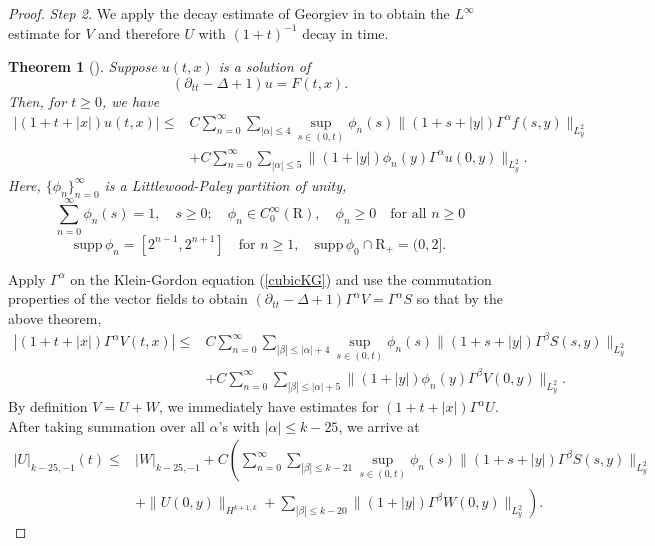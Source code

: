 \documentclass[12pt]{amsart}
\newtheorem{theorem}{Theorem}[section]
\numberwithin{equation}{section} \numberwithin{theorem}{section}
\numberwithin{example}{section} \numberwithin{remark}{section}
\numberwithin{figure}{section} \numberwithin{algorithm}{section}
\def\be{\begin{equation}}
\def\ee{\end{equation}}
\def\ptt{\partial_{tt}}
\def\mR{\mbox{R}}
\def\Ga{\Gamma^{\alpha}}
\def\Gb{\Gamma^{\beta}}
\def\LGN{|}
\def\RGN#1{|_{#1}}
\def\Hw{H}
\begin{document}
\begin{proof}
\emph{Step 2.} We apply the decay estimate of Georgiev in
\cite{Georgiev} to obtain the $L^\infty$ estimate for $V$ and
therefore $U$ with $(1+t)^{-1}$ decay in time.
\begin{theorem}[{\cite[Theorem 1]{Georgiev}}]\label{thm:Georgiev}Suppose $u(t,x)$
is a solution of\[(\ptt -\Delta +1)u=F(t,x).\]Then, for $t\ge0$, we
have
\[
\begin{split}|(1+t+|x|)u(t,x)|\le& C\sum_{n=0}^\infty\sum_{|\alpha|\le4}
\sup_{s\in(0,t)}\phi_n(s)\|(1+s+|y|)\Ga f(s,y)\|_{L^2_y}\\
&+C\sum_{n=0}^\infty\sum_{|\alpha|\le5}\|(1+|y|)\phi_n(y)\Ga
u(0,y)\|_{L^2_y}.
\end{split}
\]
Here, $\{\phi_n\}_{n=0}^\infty$ is a Littlewood-Paley partition of
unity,
\[\sum_{n=0}^\infty\phi_n(s)=1,\quad s\ge0;\quad\phi_n\in C^\infty_0(\mR),
\quad\phi_n\ge0\quad\mbox{for all }n\ge0\]
\[\mbox{supp}\,\phi_n=[2^{n-1},2^{n+1}]\quad\mbox{for }n\ge1,
\quad\mbox{supp}\,\phi_0\cap\mR_+=(0,2].\]
\end{theorem}

Apply $\Ga$ on the Klein-Gordon equation (\ref{cubicKG}) and use the
commutation properties of the vector fields to obtain \((\ptt
-\Delta +1)\Ga V=\Ga S\) so that by the above theorem,
\[
\begin{split}|(1+t+|x|)\Ga V(t,x)|\le& C\sum_{n=0}^\infty
\sum_{|\beta|\le|\alpha|+4}
\sup_{s\in(0,t)}\phi_n(s)\|(1+s+|y|)\Gb S(s,y)\|_{L^2_y}\\
&+C\sum_{n=0}^\infty\sum_{|\beta|\le|\alpha|+5}
\|(1+|y|)\phi_n(y)\Gb V(0,y)\|_{L^2_y}.
\end{split}
\]
By definition $V=U+W$, we immediately have estimates for
$(1+t+|x|)\Ga U$. After taking summation over all $\alpha$'s with
$|\alpha|\le k-25$, we arrive at \be\label{estimate:infty}
\begin{split}\LGN U\RGN{k-25,-1}(t)\le& \LGN W\RGN{k-25,-1}+
C\left(\sum_{n=0}^\infty\sum_{|\beta|\le k-21}
\sup_{s\in(0,t)}\phi_n(s)\|(1+s+|y|)\Gb S(s,y)\|_{L^2_y}\right.\\
&\left.+\|U(0,y)\|_{\Hw^{k+1,k}}+\sum_{|\beta|\le k-20}\|(1+|y|)\Gb
W(0,y)\|_{L^2_y}\right).\end{split} \ee


\end{proof}
\end{document}
